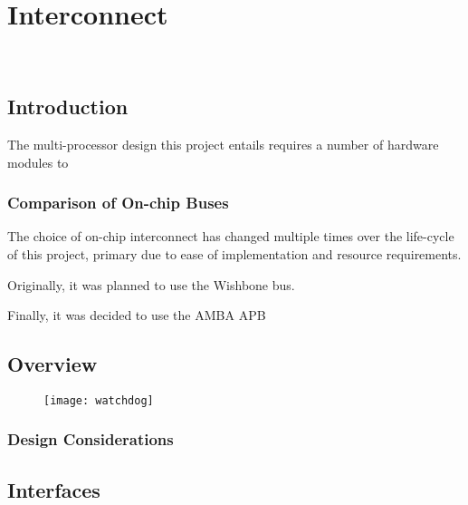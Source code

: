
\newpage
\chapter{Interconnect}
{%
\startcontents[chapters]
}

\noindent\\
\lipsum[1]

\section{Introduction}
The multi-processor design this project entails requires a number of hardware modules to 

\subsection{Comparison of On-chip Buses}
The choice of on-chip interconnect has changed multiple times over the life-cycle of this project, primary due to ease of implementation and resource requirements. 

Originally, it was planned to use the Wishbone bus.

Finally, it was decided to use the AMBA APB


\newpage
\section{Overview}
\begin{figure}[H]
\centering
\texttt{[image: watchdog]}
\end{figure}
\subsection{Design Considerations}

\section{Interfaces}

